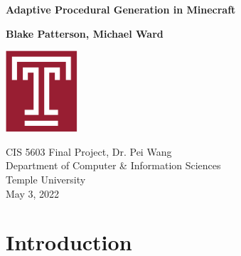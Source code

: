 \documentclass[11pt, oneside]{article}
\begin{document}
\begin{titlepage}
    \begin{center}
        \vspace*{1cm}
            
        \Huge
        \textbf{Adaptive Procedural Generation in Minecraft}
            
        \vspace{0.5cm}
        \LARGE

            
        \vspace{1.5cm}
            
        \textbf{Blake Patterson, Michael Ward}
            
        \vfill
            
            
        \vspace{0.8cm}
            
        \includegraphics[width=0.2\textwidth]{temple}
            
        \Large
        CIS 5603 Final Project, Dr. Pei Wang \\
        Department of Computer \& Information Sciences\\
        Temple University\\
        May 3, 2022
            
    \end{center}
\end{titlepage}

\newpage
\tableofcontents
\newpage
{}


\section{Introduction}
\label{Introduction}
\end{document}
